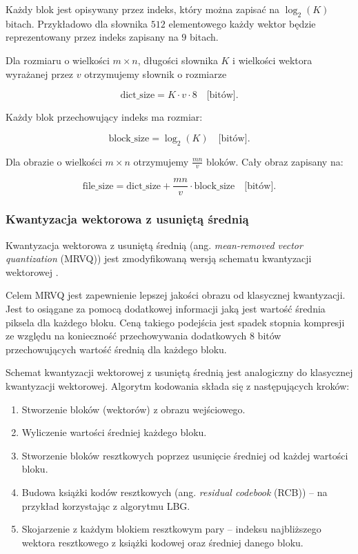 \documentclass{article}
\begin{document}
Każdy blok jest opisywany przez indeks, który można zapisać na $\log_2(K)$ bitach. Przykładowo dla słownika $512$ elementowego każdy wektor będzie reprezentowany przez indeks zapisany na $9$ bitach.


Dla rozmiaru o wielkości $m \times n$, długości słownika $K$ i wielkości wektora wyrażanej przez $v$ otrzymujemy słownik o rozmiarze

\begin{equation}
  \textrm{dict\_size} = K \cdot v \cdot 8 \quad \textrm{[bitów]}.
  \label{eq:lgb_dict_size}
\end{equation}

Każdy blok przechowujący indeks ma rozmiar:

\begin{equation}
  \textrm{block\_size} = \log_2(K)  \quad  \textrm{[bitów]}.
  \label{eq:lgb_indeks_size}
\end{equation}

Dla obrazie o wielkości $m \times n$ otrzymujemy $\frac{mn}{v}$ bloków. Cały obraz zapisany na: 

\begin{equation}
  \textrm{file\_size} = \textrm{dict\_size} + \frac{mn}{v} \cdot \textrm{block\_size}  \quad  \textrm{[bitów]}.
  \label{eq:lgb_image_size}
\end{equation}

\subsubsection{Kwantyzacja wektorowa z usuniętą średnią}

Kwantyzacja wektorowa z usuniętą średnią (ang. \emph{mean-removed vector quantization} (MRVQ)) jest zmodyfikowaną wersją schematu kwantyzacji wektorowej \cite{meanremovedVQ}.

Celem MRVQ jest zapewnienie lepszej jakości obrazu od klasycznej kwantyzacji. Jest to osiągane za pomocą dodatkowej informacji jaką jest wartość średnia piksela dla każdego bloku. Ceną takiego podejścia jest spadek stopnia kompresji ze względu na konieczność przechowywania dodatkowych 8 bitów przechowujących wartość średnią dla każdego bloku.

Schemat kwantyzacji wektorowej z usuniętą średnią jest analogiczny do klasycznej kwantyzacji wektorowej. Algorytm kodowania składa się z następujących kroków:

\begin{enumerate}
  \item Stworzenie bloków (wektorów) z obrazu wejściowego.
  \item Wyliczenie wartości średniej każdego bloku.
  \item Stworzenie bloków resztkowych poprzez usunięcie średniej od każdej wartości bloku.
  \item Budowa książki kodów resztkowych (ang. \emph{residual codebook} (RCB)) -- na przykład korzystając z algorytmu LBG.
  \item Skojarzenie z każdym blokiem resztkowym pary -- indeksu najbliższego wektora resztkowego z książki kodowej oraz średniej danego bloku.
\end{enumerate}
\end{document}
